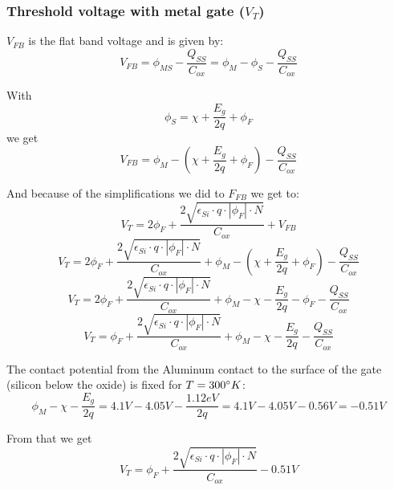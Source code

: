 \subsubsection{Threshold voltage with metal gate ($V_T$)}
$V_{FB}$ is the flat band voltage and is given by:
\begin{equation}
V_{FB}
=
\phi_{MS} - \frac{Q_{SS}}{C_{ox}}
=
\phi_{M} - \phi_{S} - \frac{Q_{SS}}{C_{ox}}
\end{equation}

With
\begin{equation}
\phi_{S}
=
\chi + \frac{E_g}{2 q} + \phi_F 
\end{equation}
we get
\begin{equation}
V_{FB}
=
\phi_{M} -  \left(\chi + \frac{E_g}{2 q} + \phi_F \right) - \frac{Q_{SS}}{C_{ox}}
\end{equation}

And because of the simplifications we did to $F_{FB}$ we get to:
\begin{equation}
V_T = 2 \phi_F + \frac{2 \sqrt{\epsilon_{Si}\cdot q\cdot \left| \phi_F \right| \cdot N }}{C_{ox}} + V_{FB}
\end{equation}
\begin{equation}
V_T = 2 \phi_F + \frac{2 \sqrt{\epsilon_{Si}\cdot q\cdot \left| \phi_F \right| \cdot N }}{C_{ox}} + \phi_{M} -  \left(\chi + \frac{E_g}{2 q} + \phi_F \right) - \frac{Q_{SS}}{C_{ox}}
\end{equation}
\begin{equation}
V_T = 2 \phi_F + \frac{2 \sqrt{\epsilon_{Si}\cdot q\cdot \left| \phi_F \right| \cdot N }}{C_{ox}} + \phi_{M} -  \chi - \frac{E_g}{2 q} - \phi_F - \frac{Q_{SS}}{C_{ox}}
\end{equation}
\begin{equation}
V_T = \phi_F + \frac{2 \sqrt{\epsilon_{Si}\cdot q\cdot \left| \phi_F \right| \cdot N }}{C_{ox}} + \phi_{M} -  \chi - \frac{E_g}{2 q} - \frac{Q_{SS}}{C_{ox}}
\end{equation}

The contact potential from the Aluminum contact to the surface of the gate (silicon below the oxide) is fixed for $T=300\degree K$:
\begin{equation}
\phi_{M} -  \chi - \frac{E_g}{2 q} = 4.1V - 4.05V - \frac{1.12eV}{2 q} = 4.1V - 4.05V - 0.56V = -0.51V
\end{equation}

From that we get
\begin{equation}
V_T = \phi_F + \frac{2 \sqrt{\epsilon_{Si}\cdot q \cdot \left| \phi_F \right| \cdot N }}{C_{ox}} - 0.51V
\end{equation}

